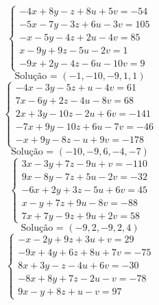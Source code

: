 \documentclass[12pt,oneside,a4paper,fleqn]{article}
\begin{document}
\begin{multicols*}{2}
\vspace{\baselineskip}
\begin{equation*}
\begin{cases}
-4x+8y-z+8u+5v=-54 \\
-5x-7y-3z+6u-3v=105 \\
-x-5y-4z+2u-4v=85 \\
x-9y+9z-5u-2v=1 \\
-9x+2y-4z-6u-10v=9
\end{cases}
\end{equation*}
\begin{equation*}
\text{Solução = }\left(-1,-10,-9,1,1\right)
\end{equation*}
\vspace{\baselineskip}
\begin{equation*}
\begin{cases}
-4x-3y-5z+u-4v=61 \\
7x-6y+2z-4u-8v=68 \\
2x+3y-10z-2u+6v=-141 \\
-7x+9y-10z+6u-7v=-46 \\
-x+9y-8z-u+9v=-178
\end{cases}
\end{equation*}
\begin{equation*}
\text{Solução = }\left(-10,-9,6,-4,-7\right)
\end{equation*}
\vspace{\baselineskip}
\begin{equation*}
\begin{cases}
3x-3y+7z-9u+v=-110 \\
9x-8y-7z+5u-2v=-32 \\
-6x+2y+3z-5u+6v=45 \\
x-y+7z+9u-8v=-88 \\
7x+7y-9z+9u+2v=58
\end{cases}
\end{equation*}
\begin{equation*}
\text{Solução = }\left(-9,2,-9,2,4\right)
\end{equation*}
\vspace{\baselineskip}
\begin{equation*}
\begin{cases}
-x-2y+9z+3u+v=29 \\
-9x+4y+6z+8u+7v=-75 \\
8x+3y-z-4u+6v=-30 \\
-8x+8y+7z-2u-v=-78 \\
9x-y+8z+u-v=97
\end{cases}

\end{equation*}
\end{multicols*}
\end{document}
